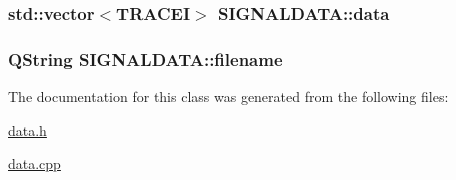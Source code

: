 \hypertarget{class_s_i_g_n_a_l_d_a_t_a_3731f410a1aeed974914860ddd089eeb}{
\subsubsection[{data}]{\setlength{\rightskip}{0pt plus 5cm}std::vector$<${\bf TRACEI}$>$ {\bf SIGNALDATA::data}}}
\label{class_s_i_g_n_a_l_d_a_t_a_3731f410a1aeed974914860ddd089eeb}


\hypertarget{class_s_i_g_n_a_l_d_a_t_a_3e0058672e5c14f24c2502eb2c0b46f0}{
\subsubsection[{filename}]{\setlength{\rightskip}{0pt plus 5cm}QString {\bf SIGNALDATA::filename}}}
\label{class_s_i_g_n_a_l_d_a_t_a_3e0058672e5c14f24c2502eb2c0b46f0}




The documentation for this class was generated from the following files:\begin{CompactItemize}
\item 
\hyperlink{data_8h}{data.h}\item 
\hyperlink{data_8cpp}{data.cpp}\end{CompactItemize}
